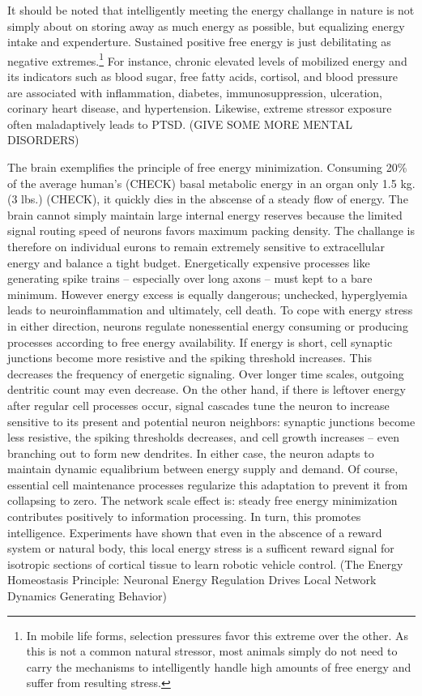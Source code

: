 It should be noted that intelligently meeting the energy challange in nature is not simply about on storing away as much energy as possible, but equalizing energy intake and expenderture. Sustained positive free energy is just debilitating as negative extremes.\footnote{In mobile life forms, selection pressures favor this extreme over the other. As this is not a common natural stressor, most animals simply do not need to carry the mechanisms to intelligently handle high amounts of free energy and suffer from resulting stress. } For instance, chronic elevated levels of mobilized energy and its indicators such as blood sugar, free fatty acids, cortisol, and blood pressure are associated with inflammation, diabetes, immunosuppression, ulceration, corinary heart disease, and hypertension. Likewise, extreme stressor exposure often maladaptively leads to PTSD. (GIVE SOME MORE MENTAL DISORDERS)

The brain exemplifies the principle of free energy minimization. Consuming 20\% of the average human's (CHECK) basal metabolic energy in an organ only 1.5 kg. (3 lbs.) (CHECK), it quickly dies in the abscense of a steady flow of energy. The brain cannot simply maintain large internal energy reserves because the limited signal routing speed of neurons favors maximum packing density. The challange is therefore on individual eurons to remain extremely sensitive to extracellular energy and balance a tight budget. Energetically expensive processes like generating spike trains -- especially over long axons -- must kept to a bare minimum. However energy excess is equally dangerous; unchecked, hyperglyemia leads to neuroinflammation and ultimately, cell death. To cope with energy stress in either direction, neurons regulate nonessential energy consuming or producing processes according to free energy availability. If energy is short, cell synaptic junctions become more resistive and the spiking threshold increases. This decreases the frequency of energetic signaling. Over longer time scales, outgoing dentritic count may even decrease. On the other hand, if there is leftover energy after regular cell processes occur, signal cascades tune the neuron to increase sensitive to its present and potential neuron neighbors: synaptic junctions become less resistive, the spiking thresholds decreases, and cell growth increases -- even branching out to form new dendrites. In either case, the neuron adapts to maintain dynamic equalibrium between energy supply and demand. Of course, essential cell maintenance processes regularize this adaptation to prevent it from collapsing to zero. The network scale effect is: steady free energy minimization contributes positively to information processing. In turn, this promotes intelligence. Experiments have shown that even in the abscence of a reward system or natural body, this local energy stress is a sufficent reward signal for isotropic sections of cortical tissue to learn robotic vehicle control. (The Energy Homeostasis Principle: Neuronal Energy Regulation Drives Local Network Dynamics Generating Behavior) 

